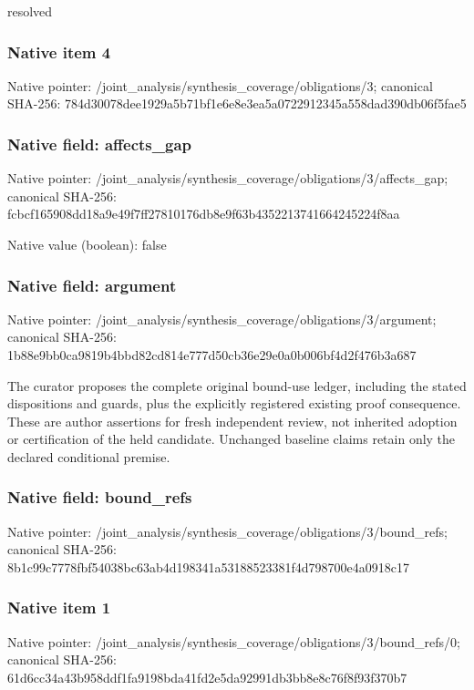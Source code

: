 \documentclass[10pt,a4paper]{article}
\begin{document}
\begingroup\raggedright\sloppy resolved\par\endgroup

\subsubsection{Native item 4}
Native pointer: /joint\_\allowbreak{}analysis/synthesis\_\allowbreak{}coverage/obligations/3; canonical SHA-256: 784d30078dee1929a5b71bf1e6e8e3ea5a0722912345a558dad390db06f5fae5

\subsubsection{Native field: affects\_\allowbreak{}gap}
Native pointer: /joint\_\allowbreak{}analysis/synthesis\_\allowbreak{}coverage/obligations/3/affects\_\allowbreak{}gap; canonical SHA-256: fcbcf165908dd18a9e49f7ff27810176db8e9f63b4352213741664245224f8aa

Native value (boolean): false

\subsubsection{Native field: argument}
Native pointer: /joint\_\allowbreak{}analysis/synthesis\_\allowbreak{}coverage/obligations/3/argument; canonical SHA-256: 1b88e9bb0ca9819b4bbd82cd814e777d50cb36e29e0a0b006bf4d2f476b3a687

\begingroup\raggedright\sloppy The curator proposes the complete original bound-use ledger,\allowbreak{} including the stated dispositions and guards,\allowbreak{} plus the explicitly registered existing proof consequence. These are author assertions for fresh independent review,\allowbreak{} not inherited adoption or certification of the held candidate. Unchanged baseline claims retain only the declared conditional premise.\par\endgroup

\subsubsection{Native field: bound\_\allowbreak{}refs}
Native pointer: /joint\_\allowbreak{}analysis/synthesis\_\allowbreak{}coverage/obligations/3/bound\_\allowbreak{}refs; canonical SHA-256: 8b1c99c7778fbf54038bc63ab4d198341a53188523381f4d798700e4a0918c17

\subsubsection{Native item 1}
Native pointer: /joint\_\allowbreak{}analysis/synthesis\_\allowbreak{}coverage/obligations/3/bound\_\allowbreak{}refs/0; canonical SHA-256: 61d6cc34a43b958ddf1fa9198bda41fd2e5da92991db3bb8e8c76f8f93f370b7
\end{document}
